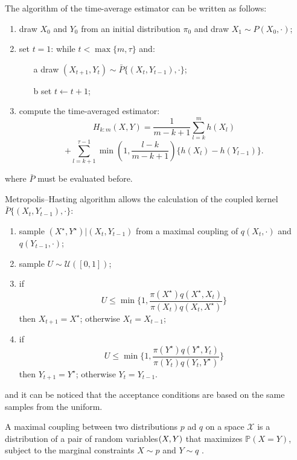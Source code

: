 \documentclass[11pt,a4paper,oneside]{report}
\begin{document}
The algorithm of the time-average estimator can be written as follows:
\begin{enumerate}
	\item draw $X_0$ and $Y_0$ from an initial distribution $\pi_0$ and draw $X_1 \sim P(X_0, \cdot)$;
	\item set $t=1$: while $t<\max\{m,\tau\}$ and:
	\begin{itemize}
		\item[a] draw $(X_{t+1}, Y_t)\sim \bar P \{(X_t, Y_{t-1}), \cdot \}$; %
		\item[b] set $t \leftarrow t+1$;
	\end{itemize}
	\item compute the time-averaged estimator:	 	$$
		H_{k:m}(X,Y)
		= \frac{1}{m-k+1}\sum_{l=k}^{m}h(X_l) $$
		$$
		+ \sum_{l=k+1}^{\tau -1}\min(1, \frac{l-k}{m-k+1})\{h(X_l)-h(Y_{l-1})\} .
		$$
	
\end{enumerate}
where $ \bar P$ must be evaluated before.


	Metropolis--Hasting algorithm allows the calculation of the coupled kernel $\bar P \{(X_t, Y_{t-1}), \cdot \}$:
	
	\begin{enumerate}
		\item sample $(X^\star, Y^\star) | (X_t, Y_{t-1})$ from a maximal coupling of $q(X_t, \cdot)$ and $q(Y_{t-1}, \cdot)$;
		\item sample $U \sim \mathcal{U}([0,1])$;
		\item if
		$$ U
		\leq \min\bigg \{
		1,
		\frac{ \pi(X^\star)q(X^\star,X_t)}{
			\pi(X_t)q(X_t, X^\star)}
		\bigg \}
		$$
		then $X_{t+1} = X^\star$; otherwise $X_t = X_{t-1}$;
		\item if
		$$ U
		\leq \min\bigg \{ 
		1,
		\frac{ \pi(Y^\star)q(Y^\star,Y_t)}{
			\pi(Y_t)q(Y_t, Y^\star)}
		\bigg \}
		$$
		then $Y_{t+1} = Y^\star$; otherwise $Y_t = Y_{t-1}$.
		
	\end{enumerate}

and it can be noticed that the acceptance conditions are based on the same samples from the uniform.

A maximal coupling between two distributions $p$ ad $q$ on a space $\mathcal{X}$ is a distribution of a pair of random variables$(X, \space Y)$ that maximizes $\mathbb{P}(X=Y)$, subject to the marginal constraints $X\sim p$ and $Y \sim q$ \cite{zhang2020markov} \cite{Cordaro2017past}.
\end{document}
